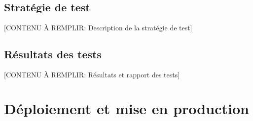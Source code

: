 
\subsection{Stratégie de test}

[CONTENU À REMPLIR: Description de la stratégie de test]


\subsection{Résultats des tests}

[CONTENU À REMPLIR: Résultats et rapport des tests]


\section{Déploiement et mise en production}


